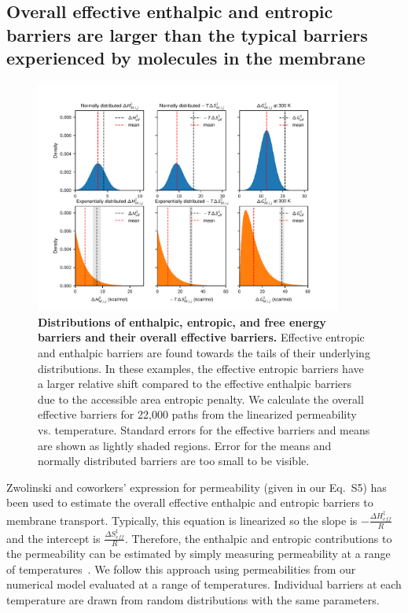 \documentclass[12pt]{article}
\begin{document}
\subsection*{Overall effective enthalpic and entropic barriers are larger than the typical barriers experienced by molecules in the membrane}

\begin{figure}[ht!]
    \includegraphics[width=0.9\textwidth]{figures/fig6.pdf}
    \caption{\textbf{Distributions of enthalpic, entropic, and free energy barriers and their overall effective barriers.} Effective entropic and enthalpic barriers are found towards the tails of their underlying distributions. In these examples, the effective entropic barriers have a larger relative shift compared to the effective enthalpic barriers due to the accessible area entropic penalty. We calculate the overall effective barriers for 22,000 paths from the linearized permeability vs. temperature. Standard errors for the effective barriers and means are shown as lightly shaded regions. Error for the means and normally distributed barriers are too small to be visible.}
    \label{fig:dH_dS_distributions}
\end{figure}

Zwolinski and coworkers' expression for permeability (given in our Eq.~S5) has been used to estimate the overall effective enthalpic and entropic barriers to membrane transport. Typically, this equation is linearized so the slope is $-\frac{\Delta H_{eff}^{\ddagger}}{R}$ and the intercept is $\frac{\Delta S_{eff}^{\ddagger}}{R}$. Therefore, the enthalpic and entropic contributions to the permeability can be estimated by simply measuring permeability at a range of temperatures~\cite{shefer_applying_2022}. We follow this approach using permeabilities from our numerical model evaluated at a range of temperatures. Individual barriers at each temperature are drawn from random distributions with the same parameters.
\end{document}
